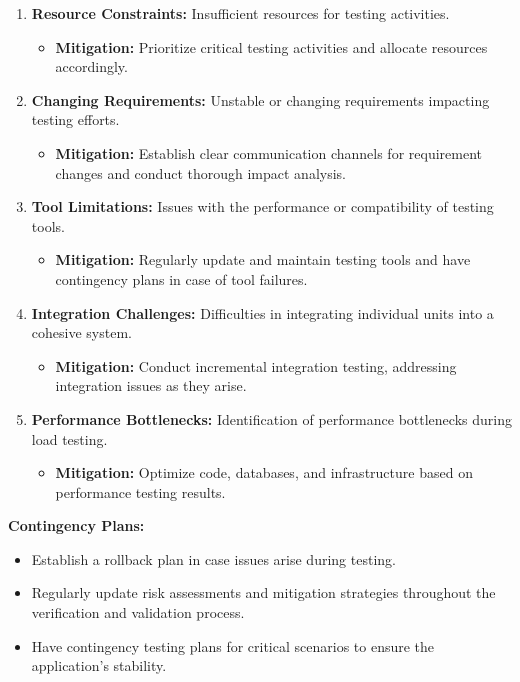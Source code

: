 \documentclass[
]{article}
\begin{document}
\begin{enumerate}
\def\labelenumi{\arabic{enumi}.}
\item
  \textbf{Resource Constraints:} Insufficient resources for testing
  activities.

  \begin{itemize}
  \item
    \textbf{Mitigation:} Prioritize critical testing activities and
    allocate resources accordingly.
  \end{itemize}
\item
  \textbf{Changing Requirements:} Unstable or changing requirements
  impacting testing efforts.

  \begin{itemize}
  \item
    \textbf{Mitigation:} Establish clear communication channels for
    requirement changes and conduct thorough impact analysis.
  \end{itemize}
\item
  \textbf{Tool Limitations:} Issues with the performance or
  compatibility of testing tools.

  \begin{itemize}
  \item
    \textbf{Mitigation:} Regularly update and maintain testing tools and
    have contingency plans in case of tool failures.
  \end{itemize}
\item
  \textbf{Integration Challenges:} Difficulties in integrating
  individual units into a cohesive system.

  \begin{itemize}
  \item
    \textbf{Mitigation:} Conduct incremental integration testing,
    addressing integration issues as they arise.
  \end{itemize}
\item
  \textbf{Performance Bottlenecks:} Identification of performance
  bottlenecks during load testing.

  \begin{itemize}
  \item
    \textbf{Mitigation:} Optimize code, databases, and infrastructure
    based on performance testing results.
  \end{itemize}
\end{enumerate}

\textbf{Contingency Plans:}

\begin{itemize}
\item
  Establish a rollback plan in case issues arise during testing.
\item
  Regularly update risk assessments and mitigation strategies throughout
  the verification and validation process.
\item
  Have contingency testing plans for critical scenarios to ensure the
  application's stability.
\end{itemize}
\end{document}
